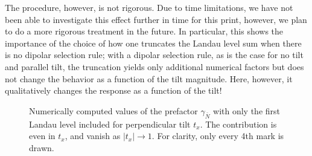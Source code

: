 The procedure, however, is not rigorous.
Due to time limitations, we have not been able to investigate this effect further in time for this print, however, we plan to do a more rigorous treatment in the future.
In particular, this shows the importance of the choice of how one truncates the Landau level sum when there is no dipolar selection rule;
with a dipolar selection rule, as is the case for no tilt and parallel tilt, the truncation yields only additional numerical factors but does not change the behavior as a function of the tilt magnitude.
Here, however, it qualitatively changes the response as a function of the tilt!
\nowidow[3]

\begin{figure}[htb]
  \centering
  \caption{Numerically computed values of the prefactor \( \gamma_{\bar{N}} \) with only the first Landau level included for perpendicular tilt \( t_x \).
    The contribution is even in \( t_x \), and vanish as \( |t_x| \to 1 \).
    For clarity, only every 4th mark is drawn.
    \label{fig:0tontx}
  }
\end{figure}



